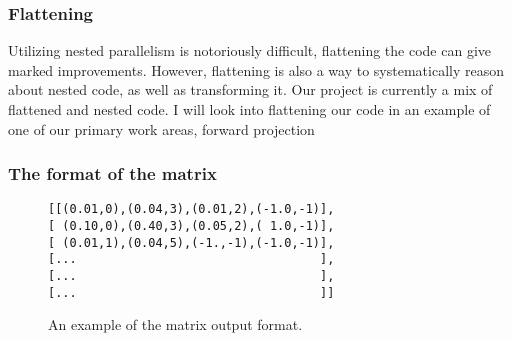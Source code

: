 \documentclass{beamer}
\begin{document}
\begin{frame}
  \frametitle{Flattening}
  Utilizing nested parallelism is notoriously difficult, flattening the code can give marked improvements. However, flattening is also a way to systematically reason about nested code, as well as transforming it. Our project is currently a mix of flattened and nested code.\newline
  \newline
  I will look into flattening our code in an example of one of our primary work areas, forward projection
\end{frame}

\begin{frame}[fragile]
\frametitle{The format of the matrix}
\begin{figure}[!h]
\begin{lstlisting}[frame=single]
[[(0.01,0),(0.04,3),(0.01,2),(-1.0,-1)],
[ (0.10,0),(0.40,3),(0.05,2),( 1.0,-1)],
[ (0.01,1),(0.04,5),(-1.,-1),(-1.0,-1)],
[...                                  ],
[...                                  ],
[...                                  ]]
\end{lstlisting}
  \caption{An example of the matrix output format.}
\end{figure}
\end{frame}

%
\end{document}
